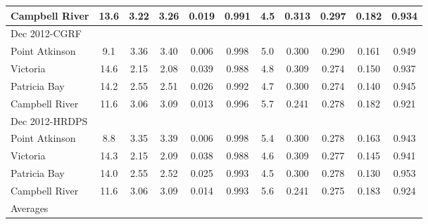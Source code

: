 \documentclass{tATO2e}
\begin{document}
\begin{table}[h]
{\begin{tabular}{|l |c c c c c | c c c c c|}
Campbell River & 13.6           &  3.22                & 3.26                 &   0.019    & 0.991  &  4.5           &  0.313                 & 0.297                  &  0.182     & 0.934 \\
\hline 
Dec 2012-CGRF &                &                      &                      &            &        &                &                        &                        &           &           \\ 
Point Atkinson &  9.1           &  3.36                & 3.40                 &   0.006    & 0.998  &  5.0           &  0.300                 & 0.290                  &  0.161     & 0.949 \\
Victoria       & 14.6           &  2.15                & 2.08                 &   0.039    & 0.988  &  4.8           &  0.309                 & 0.274                  &  0.150     & 0.937 \\
Patricia Bay   & 14.2           &  2.55                & 2.51                 &   0.026    & 0.992  &  4.7           &  0.300                 & 0.274                  &  0.140     & 0.945 \\
Campbell River & 11.6           &  3.06                & 3.09                 &   0.013    & 0.996  &  5.7           &  0.241                 & 0.278                  &  0.182     & 0.921 \\
\hline 
Dec 2012-HRDPS &                &                      &                      &            &        &                &                        &                        &           &           \\
Point Atkinson &  8.8           &  3.35                & 3.39                 &   0.006    & 0.998  &  5.4           &  0.300                 & 0.278                  &  0.163     & 0.943 \\
Victoria       & 14.3           &  2.15                & 2.09                 &   0.038    & 0.988  &  4.6           &  0.309                 & 0.277                  &  0.145     & 0.941 \\
Patricia Bay   & 14.0           &  2.55                & 2.52                 &   0.025    & 0.993  &  4.5           &  0.300                 & 0.278                  &  0.130     & 0.953 \\
Campbell River & 11.6           &  3.06                & 3.09                 &   0.014    & 0.993  &  5.6           &  0.241                 & 0.275                  &  0.183     & 0.924 \\
\hline 
\hline
Averages       &                &                      &                      &            &        &                &                        &                        &           &         \\                

\end{tabular}}
\end{table}
\end{document}
